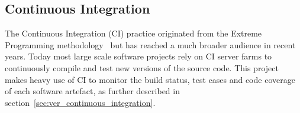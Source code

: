 
\subsection{Continuous Integration}

The Continuous Integration (CI) practice originated from the Extreme Programming methodology~\cite{extreme_programming} but has reached a much broader audience in recent years. Today most large scale software projects rely on CI server farms to continuously compile and test new versions of the source code. This project makes heavy use of CI to monitor the build status, test cases and code coverage of each software artefact, as further described in section~\ref{sec:ver_continuous_integration}.
